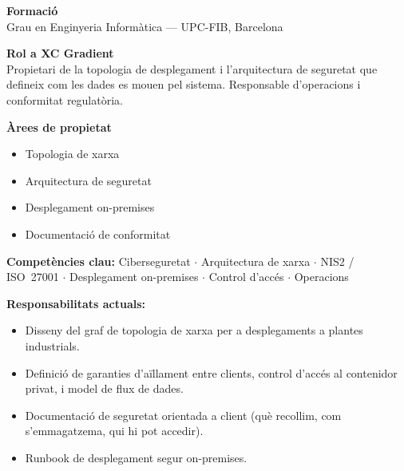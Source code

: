 \documentclass[11pt,a4paper]{article}
\begin{document}
\vspace{1em}


\begin{profilebox}[title={\large\bfseries\color{dark} Adam Sarrate \hfill \normalsize COO / CISO}]

\begin{minipage}[t]{0.65\textwidth}
\textbf{Formació}\\
Grau en Enginyeria Informàtica --- UPC-FIB, Barcelona

\vspace{0.5em}
\textbf{Rol a XC Gradient}\\
Propietari de la topologia de desplegament i l'arquitectura de seguretat que defineix com les dades es mouen pel sistema. Responsable d'operacions i conformitat regulatòria.
\end{minipage}%
\hfill%
\begin{minipage}[t]{0.32\textwidth}
\small
\textbf{Àrees de propietat}
\begin{itemize}[leftmargin=0.8em,itemsep=1pt,topsep=2pt]
\item Topologia de xarxa
\item Arquitectura de seguretat
\item Desplegament on-premises
\item Documentació de conformitat
\end{itemize}
\end{minipage}

\vspace{0.5em}
\begin{skillbox}
\small\textbf{Competències clau:} Ciberseguretat $\cdot$ Arquitectura de xarxa $\cdot$ NIS2 / ISO~27001 $\cdot$ Desplegament on-premises $\cdot$ Control d'accés $\cdot$ Operacions
\end{skillbox}

\vspace{0.3em}
\small\textbf{Responsabilitats actuals:}
\begin{itemize}[leftmargin=1.2em,itemsep=1pt]
\item Disseny del graf de topologia de xarxa per a desplegaments a plantes industrials.
\item Definició de garanties d'aïllament entre clients, control d'accés al contenidor privat, i model de flux de dades.
\item Documentació de seguretat orientada a client (què recollim, com s'emmagatzema, qui hi pot accedir).
\item Runbook de desplegament segur on-premises.
\end{itemize}
\end{profilebox}
\end{document}

